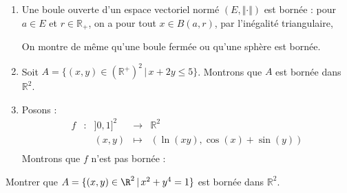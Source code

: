 \documentclass[french,11pt,twoside]{VcCours}
\begin{document}
\begin{Exemples}
\begin{enumerate}
\item Une boule ouverte d'un espace vectoriel normé $(E, \Vert \cdot \Vert)$ est bornée : pour $a \in E$ et $r \in \mathbb{R}_+$, on a pour tout $x \in B(a,r)$, par l'inégalité triangulaire,

\vspace*{2cm}
On montre de même qu'une boule fermée ou qu'une sphère est bornée.
\item Soit $A = \lbrace (x,y) \in (\mathbb{R}^+)^2 \, \vert \, x+2y \leq 5 \rbrace$. Montrons que $A$ est bornée dans $\mathbb{R}^2$.

\vspace*{4cm}
\item Posons :
$$ \begin{array}{ccccl}
f & : & ]0,1]^2 & \rightarrow & \mathbb{R}^2 \\
& & (x,y)   & \mapsto & (\ln(xy), \cos(x)+ \sin(y)) \\
\end{array}$$
Montrons que $f$ n'est pas bornée : 

\vspace*{4cm}
\end{enumerate}
\end{Exemples}

\begin{ApplicationDirecte}{} Montrer que $A = \lbrace (x,y)\in\R^2 \, \vert \, x^2+y^4=1 \rbrace$ est bornée dans $\mathbb{R}^2$.
\end{ApplicationDirecte}
\end{document}
